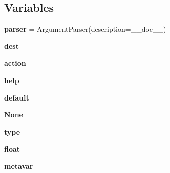 \subsection*{Variables}
\begin{DoxyCompactItemize}
\item 
\mbox{\label{namespacepymavlink_1_1tools_1_1magfit__motors_af14464509f99203a4b7a9d8d921e9e44}} 
{\bfseries parser} = Argument\+Parser(description=\+\_\+\+\_\+doc\+\_\+\+\_\+)
\item 
\mbox{\label{namespacepymavlink_1_1tools_1_1magfit__motors_a98281994246dadaf6c0650facb414254}} 
{\bfseries dest}
\item 
\mbox{\label{namespacepymavlink_1_1tools_1_1magfit__motors_a913c48c5ca0e3ab4afe744743e5d8a97}} 
{\bfseries action}
\item 
\mbox{\label{namespacepymavlink_1_1tools_1_1magfit__motors_a26555be2425d9499fca7470a3e8b61b9}} 
{\bfseries help}
\item 
\mbox{\label{namespacepymavlink_1_1tools_1_1magfit__motors_afbccfb7c9d8d3f32508f8ddc87a3b7c0}} 
{\bfseries default}
\item 
\mbox{\label{namespacepymavlink_1_1tools_1_1magfit__motors_a799d3ced2a839245c04875d15154007c}} 
{\bfseries None}
\item 
\mbox{\label{namespacepymavlink_1_1tools_1_1magfit__motors_a02f44d9e6b0605a85106254aa809f414}} 
{\bfseries type}
\item 
\mbox{\label{namespacepymavlink_1_1tools_1_1magfit__motors_adacd10b5a5e5dcbda0ac78a5331dd855}} 
{\bfseries float}
\item 
\mbox{\label{namespacepymavlink_1_1tools_1_1magfit__motors_a57935f8392a1c7e85ce53789def3d3f3}} 
{\bfseries metavar}
\item 

\end{DoxyCompactItemize}
